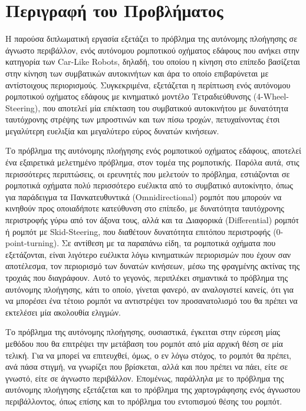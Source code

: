 
\section{Περιγραφή του Προβλήματος}
Η παρούσα διπλωματική εργασία εξετάζει το πρόβλημα της αυτόνομης πλοήγησης σε άγνωστο περιβάλλον, ενός αυτόνομου ρομποτικού οχήματος εδάφους που ανήκει στην κατηγορία των Car-Like Robots, δηλαδή, του οποίου η κίνηση στο επίπεδο βασίζεται στην κίνηση των συμβατικών αυτοκινήτων και άρα το οποίο επιβαρύνεται με αντίστοιχους περιορισμούς. Συγκεκριμένα, εξετάζεται η περίπτωση ενός αυτόνομου ρομποτικού οχήματος εδάφους με κινηματικό μοντέλο Τετραδιεύθυνσης (4-Wheel-Steering), που αποτελεί μία επέκταση του συμβατικού αυτοκινήτου με δυνατότητα ταυτόχρονης στρέψης των μπροστινών και των πίσω τροχών, πετυχαίνοντας έτσι μεγαλύτερη ευελιξία και μεγαλύτερο εύρος δυνατών κινήσεων.

\bigskip
Το πρόβλημα της αυτόνομης πλοήγησης ενός ρομποτικού οχήματος εδάφους, αποτελεί ένα εξαιρετικά μελετημένο πρόβλημα, στον τομέα της ρομποτικής. Παρόλα αυτά, στις περισσότερες περιπτώσεις, οι ερευνητές που μελετούν το πρόβλημα, εστιάζονται σε ρομποτικά οχήματα πολύ περισσότερο ευέλικτα από το συμβατικό αυτοκίνητο, όπως για παράδειγμα τα Πανκατευθυντικά (Omnidirectional) ρομπότ που μπορούν να κινηθούν προς οποιαδήποτε κατεύθυνση στο επίπεδο, με δυνατότητα ταυτόχρονης περιστροφής γύρω από τον άξονα τους, αλλά και τα Διαφορικά (Differential) ρομπότ ή ρομπότ με Skid-Steering, που διαθέτουν δυνατότητα επιτόπου περιστροφής (0-point-turning). Σε αντίθεση με τα παραπάνω είδη, τα ρομποτικά οχήματα που εξετάζονται, είναι λιγότερο ευέλικτα λόγω κινηματικών περιορισμών που έχουν σαν αποτέλεσμα, τον περιορισμό των δυνατών κινήσεων, μέσω της φραγμένης ακτίνας της τροχιάς που διαγράφουν. Αυτό το γεγονός, περιπλέκει σημαντικά το πρόβλημα της αυτόνομης πλοήγησης, κάτι το οποίο, γίνεται φανερό, αν αναλογιστεί κανείς, ότι για να μπορέσει ένα τέτοιο ρομπότ να αντιστρέψει τον προσανατολισμό του θα πρέπει να εκτελέσει μία ακολουθία ελιγμών.

\bigskip
Το πρόβλημα της αυτόνομης πλοήγησης, ουσιαστικά, έγκειται στην εύρεση μίας μεθόδου που θα επιτρέψει την μετάβαση του ρομπότ από μία αρχική θέση σε μία τελική. Για να μπορεί να επιτευχθεί, όμως, ο εν λόγω στόχος, το ρομπότ θα πρέπει, ανά πάσα στιγμή, να γνωρίζει που βρίσκεται, αλλά και που πρέπει να πάει, είτε σε γνωστό, είτε σε άγνωστο περιβάλλον. Επομένως, παράλληλα με το πρόβλημα της αυτόνομης πλοήγησης εξετάζεται και το πρόβλημα της χαρτογράφησης ενός άγνωστου περιβάλλοντος, όπως επίσης και το πρόβλημα του εντοπισμού θέσης του ρομπότ.

